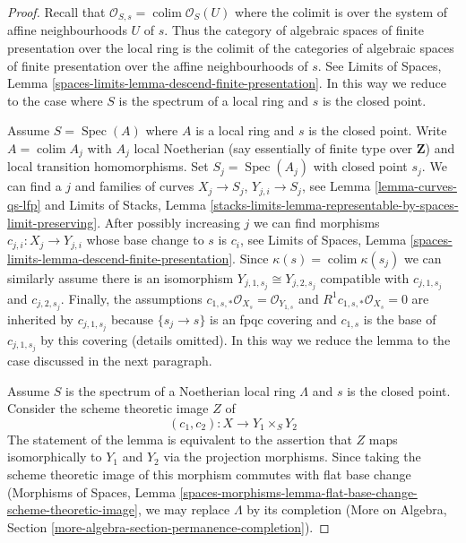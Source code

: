 \documentclass[10pt,a4paper]{amsart}
\theoremstyle{plain}
\theoremstyle{definition}
\theoremstyle{remark}
\numberwithin{equation}{subsection}
\def\colim{\mathop{\mathrm{colim}}\nolimits}
\def\Spec{\mathop{\mathrm{Spec}}}
\begin{document}
\begin{proof}
Recall that $\mathcal{O}_{S, s} = \colim \mathcal{O}_S(U)$ where
the colimit is over the system of affine neighbourhoods $U$ of $s$.
Thus the category of algebraic spaces of finite presentation over
the local ring is the colimit of the categories of algebraic spaces
of finite presentation over the affine neighbourhoods of $s$.
See Limits of Spaces, Lemma
\ref{spaces-limits-lemma-descend-finite-presentation}.
In this way we reduce to the case where $S$ is the spectrum of
a local ring and $s$ is the closed point.

\medskip\noindent
Assume $S = \Spec(A)$ where $A$ is a local ring and $s$ is the closed point.
Write $A = \colim A_j$ with $A_j$ local Noetherian (say essentially
of finite type over $\mathbf{Z}$) and local transition homomorphisms.
Set $S_j = \Spec(A_j)$ with closed point $s_j$. We can find a
$j$ and families of curves $X_j \to S_j$, $Y_{j, i} \to S_j$,
see Lemma \ref{lemma-curves-qs-lfp} and
Limits of Stacks, Lemma
\ref{stacks-limits-lemma-representable-by-spaces-limit-preserving}.
After possibly increasing $j$ we can find morphisms
$c_{j, i} : X_j \to Y_{j, i}$ whose base change to $s$ is $c_i$, see
Limits of Spaces, Lemma
\ref{spaces-limits-lemma-descend-finite-presentation}.
Since $\kappa(s) = \colim \kappa(s_j)$ we can similarly
assume there is an isomorphism $Y_{j, 1, s_j} \cong Y_{j, 2, s_j}$
compatible with $c_{j, 1, s_j}$ and $c_{j, 2, s_j}$.
Finally, the assumptions
$c_{1, s, *}\mathcal{O}_{X_s} = \mathcal{O}_{Y_{1, s}}$ and
$R^1c_{1, s, *}\mathcal{O}_{X_s} = 0$
are inherited by $c_{j, 1, s_j}$ because
$\{s_j \to s\}$ is an fpqc covering and
$c_{1, s}$ is the base of $c_{j, 1, s_j}$ by this covering (details omitted).
In this way we reduce the lemma to the case discussed in the next paragraph.

\medskip\noindent
Assume $S$ is the spectrum of a Noetherian local ring $\Lambda$ and
$s$ is the closed point. Consider the scheme theoretic image $Z$ of
$$
(c_1, c_2) : X \longrightarrow Y_1 \times_S Y_2
$$
The statement of the lemma is equivalent to the assertion that $Z$ maps
isomorphically to $Y_1$ and $Y_2$ via the projection morphisms.
Since taking the scheme theoretic image of this morphism commutes
with flat base change (Morphisms of Spaces, Lemma
\ref{spaces-morphisms-lemma-flat-base-change-scheme-theoretic-image},
we may replace $\Lambda$ by its completion
(More on Algebra, Section \ref{more-algebra-section-permanence-completion}).


\end{proof}
\end{document}
